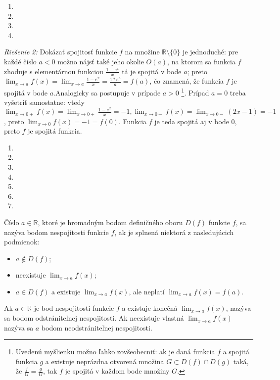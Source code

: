  \begin{enumerate}[resume]
	\item {}
	\item {}
	\item {}
	\item {}
\end{enumerate}

\textit{Riešenie 2:}
Dokázať spojitosť funkcie $f$ na množine $\mathbb{R} \setminus \{0\}$ je jednoduché: pre každé číslo $a<0$ možno nájsť také jeho okolie $O(a)$, na ktorom sa funkcia $f$ zhoduje s elementárnou funkciou $\frac{1-e^x}{x}$ tá je spojitá v bode $a$; preto $\lim_{x \rightarrow a}f(x)=\lim_{x \rightarrow a}\frac{1-e^x}{x}=\frac{1*e^a}{a}=f(a)$, čo znamená, že funkcia $f$ je spojitá v bode $a$.Analogicky sa postupuje v prípade $a>0$ \footnote{Uvedenú myšlienku možno ľahko zovšeobecniť: ak je daná funkcia $f$ a spojitá funkcia $g$ a existuje neprázdna otvorená množina $G \subset D(f) \cap D(g)$ taká, že $\frac{f}{G}=\frac{g}{G}$, tak $f$ je spojitá v každom bode množiny $G$.}. Prípad $a=0$ treba vyšetriť samostatne: vtedy $\lim_{x \rightarrow 0+}f(x)=\lim_{x \rightarrow 0+}\frac{1-e^x}{x}=-1,\lim_{x \rightarrow 0-}f(x)=\lim_{x \rightarrow 0-}(2x-1)=-1$, preto $\lim_{x \rightarrow 0}f(x)=-1=f(0)$. Funkcia $f$ je teda spojitá aj v bode $0$, preto $f$ je spojitá funkcia.

\begin{enumerate}[resume]
	\item {}
	\item {}
	\item {}
	\item {}
	\item {}
	\item {}
	\item {}
\end{enumerate}

Číslo $a \in \mathbb{R}$, ktoré je hromadným bodom definičného oboru $D(f)$ funkcie $f$, sa nazýva bodom nespojitosti funkcie $f$, ak je splnená niektorá z nasledujúcich podmienok:
\begin{itemize}
\item $a \notin D(f)$;
\item neexistuje $\lim_{x \rightarrow a}f(x)$;
\item $a \in D(f)$ a existuje $\lim_{x \rightarrow a}f(x)$, ale neplatí $\lim_{x \rightarrow a}f(x)=f(a)$.
\end{itemize}
Ak $a \in \mathbb{R}$ je bod nespojitosti funkcie $f$ a existuje konečná $\lim_{x \rightarrow a}f(x)$, nazýva sa bodom odstrániteľnej nespojitosti. Ak neexistuje vlastná $\lim_{x \rightarrow a}f(x)$ nazýva sa $a$ bodom neodstrániteľnej nespojitosti.


